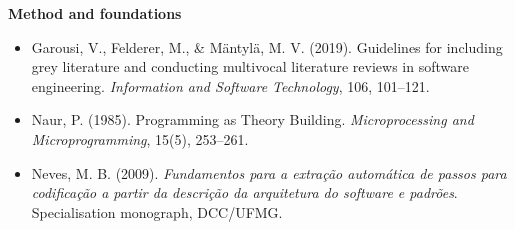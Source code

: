 \documentclass[11pt]{article}
\begin{document}
\textbf{Method and foundations}
\begin{itemize}[leftmargin=*]
  \item Garousi, V., Felderer, M., \& M\"antyl\"a, M. V. (2019). Guidelines for including grey literature and conducting multivocal literature reviews in software engineering. \emph{Information and Software Technology}, 106, 101--121.
  \item Naur, P. (1985). Programming as Theory Building. \emph{Microprocessing and Microprogramming}, 15(5), 253--261.
  \item Neves, M. B. (2009). \emph{Fundamentos para a extra\c{c}\~ao autom\'atica de passos para codifica\c{c}\~ao a partir da descri\c{c}\~ao da arquitetura do software e padr\~oes}. Specialisation monograph, DCC/UFMG.
\end{itemize}
\end{document}
